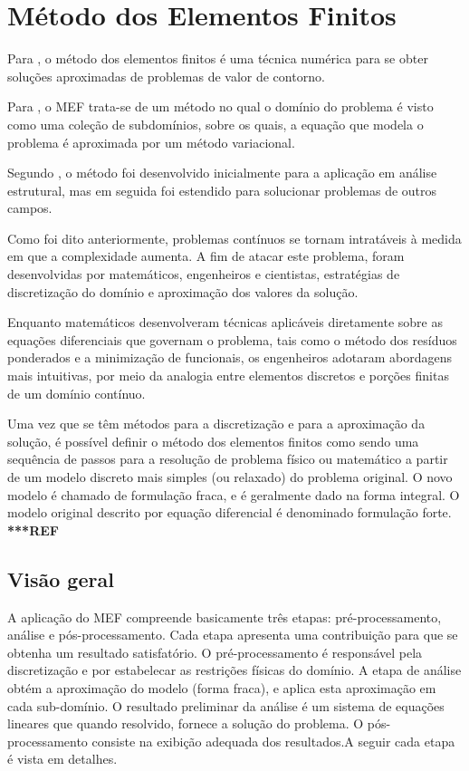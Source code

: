 \section{Método dos Elementos Finitos}

Para \citep[p. 19]{jin}, o método dos elementos finitos é uma técnica numérica para se obter soluções aproximadas de problemas de valor de contorno.

Para \citep[p. 13]{reddy}, o MEF trata-se de um método no qual o domínio do problema é visto como uma coleção de subdomínios, sobre os quais, a equação que modela o problema é aproximada por um método variacional.

Segundo \citep[p. 19]{jin},  o método foi desenvolvido inicialmente para a aplicação em análise estrutural, mas em seguida foi estendido para solucionar problemas de outros campos.

Como foi dito anteriormente, problemas contínuos se tornam intratáveis à medida em que a complexidade aumenta. 
A fim de atacar este problema, foram desenvolvidas por matemáticos, engenheiros e cientistas, estratégias de discretização do domínio e aproximação dos valores da solução. 
\citep[p. 1]{zien}

Enquanto matemáticos desenvolveram técnicas aplicáveis diretamente sobre as equações diferenciais que governam o problema, tais como o método dos resíduos ponderados e a minimização de funcionais, os engenheiros adotaram abordagens mais intuitivas, por meio da analogia entre elementos discretos e porções finitas de um domínio contínuo.
\citep[p. 1]{zien}

Uma vez que se têm métodos para a discretização e para a aproximação da solução, é possível definir o método dos elementos finitos como sendo uma sequência de passos para a resolução de problema físico ou matemático a partir de um modelo discreto mais simples (ou relaxado) do problema original. O novo modelo é chamado de formulação fraca, e é geralmente dado na forma integral. O modelo original descrito por equação diferencial é denominado formulação forte. \textbf{***REF}

\subsection{Visão geral}
A aplicação do MEF compreende basicamente três etapas: pré-processamento, análise e pós-processamento. Cada etapa apresenta uma contribuição para que se obtenha um resultado satisfatório. O pré-processamento é responsável pela discretização e por estabelecar as restrições físicas do domínio. A etapa de análise obtém a aproximação do modelo (forma fraca), e aplica esta aproximação em cada sub-domínio. O resultado preliminar da análise é um sistema de equações lineares que quando resolvido, fornece a solução do problema.  O pós-processamento consiste na exibição adequada dos resultados.A seguir cada etapa é vista em detalhes.



